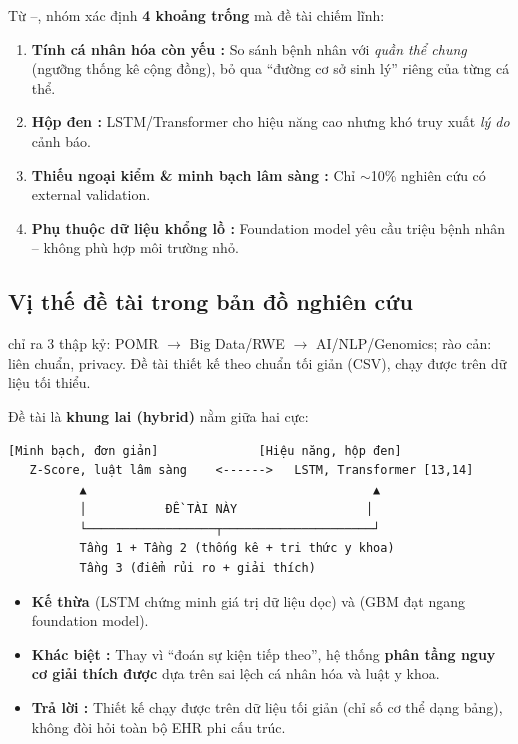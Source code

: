 \documentclass[13pt,a4paper]{article}
\begin{document}
Từ \cite{guo2024}--\cite{shen2025}, nhóm xác định \textbf{4 khoảng trống} mà đề tài chiếm lĩnh:

\begin{enumerate}
    \item \textbf{Tính cá nhân hóa còn yếu \cite{guo2024,swinckels2024,kraljevic2024,shmatko2025}:} So sánh bệnh nhân với \textit{quần thể chung} (ngưỡng thống kê cộng đồng), bỏ qua ``đường cơ sở sinh lý'' riêng của từng cá thể.
    \item \textbf{Hộp đen \cite{swinckels2024,kraljevic2024,shmatko2025}:} LSTM/Transformer cho hiệu năng cao nhưng khó truy xuất \textit{lý do} cảnh báo.
    \item \textbf{Thiếu ngoại kiểm \& minh bạch lâm sàng \cite{swinckels2024}:} Chỉ $\sim$10\% nghiên cứu có external validation.
    \item \textbf{Phụ thuộc dữ liệu khổng lồ \cite{guo2024,shen2025}:} Foundation model yêu cầu triệu bệnh nhân -- không phù hợp môi trường nhỏ.
\end{enumerate}

\subsection{Vị thế đề tài trong bản đồ nghiên cứu}

\cite{shen2025} chỉ ra 3 thập kỷ: POMR $\to$ Big Data/RWE $\to$ AI/NLP/Genomics; rào cản: liên chuẩn, privacy. Đề tài thiết kế theo chuẩn tối giản (CSV), chạy được trên dữ liệu tối thiểu.

Đề tài là \textbf{khung lai (hybrid)} nằm giữa hai cực:

\begin{verbatim}
[Minh bạch, đơn giản]              [Hiệu năng, hộp đen]
   Z-Score, luật lâm sàng    <------>   LSTM, Transformer [13,14]
          ▲                                        ▲
          │           ĐỀ TÀI NÀY                  │
          └──────────────────┬─────────────────────┘
          Tầng 1 + Tầng 2 (thống kê + tri thức y khoa)
          Tầng 3 (điểm rủi ro + giải thích)
\end{verbatim}

\begin{itemize}
    \item \textbf{Kế thừa \cite{swinckels2024}} (LSTM chứng minh giá trị dữ liệu dọc) và \textbf{\cite{guo2024}} (GBM đạt ngang foundation model).
    \item \textbf{Khác biệt \cite{kraljevic2024,shmatko2025}:} Thay vì ``đoán sự kiện tiếp theo'', hệ thống \textbf{phân tầng nguy cơ giải thích được} dựa trên sai lệch cá nhân hóa và luật y khoa.
    \item \textbf{Trả lời \cite{shen2025}:} Thiết kế chạy được trên dữ liệu tối giản (chỉ số cơ thể dạng bảng), không đòi hỏi toàn bộ EHR phi cấu trúc.
\end{itemize}
\end{document}
